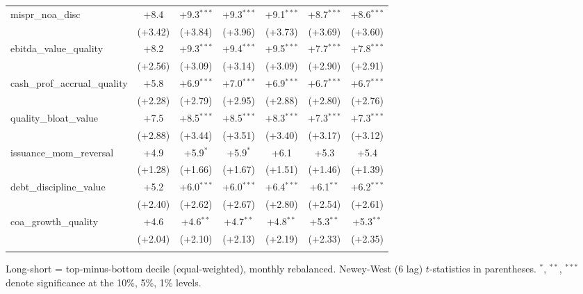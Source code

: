 \begin{table}[htbp]
\begin{threeparttable}
\begin{tabular}{lcccccc}
\addlinespace
mispr\_noa\_disc & +8.4 & +9.3$^{***}$ & +9.3$^{***}$ & +9.1$^{***}$ & +8.7$^{***}$ & +8.6$^{***}$ \\
 & (+3.42) & (+3.84) & (+3.96) & (+3.73) & (+3.69) & (+3.60) \\
\addlinespace
ebitda\_value\_quality & +8.2 & +9.3$^{***}$ & +9.4$^{***}$ & +9.5$^{***}$ & +7.7$^{***}$ & +7.8$^{***}$ \\
 & (+2.56) & (+3.09) & (+3.14) & (+3.09) & (+2.90) & (+2.91) \\
\addlinespace
cash\_prof\_accrual\_quality & +5.8 & +6.9$^{***}$ & +7.0$^{***}$ & +6.9$^{***}$ & +6.7$^{***}$ & +6.7$^{***}$ \\
 & (+2.28) & (+2.79) & (+2.95) & (+2.88) & (+2.80) & (+2.76) \\
\addlinespace
quality\_bloat\_value & +7.5 & +8.5$^{***}$ & +8.5$^{***}$ & +8.3$^{***}$ & +7.3$^{***}$ & +7.3$^{***}$ \\
 & (+2.88) & (+3.44) & (+3.51) & (+3.40) & (+3.17) & (+3.12) \\
\addlinespace
issuance\_mom\_reversal & +4.9 & +5.9$^{*}$ & +5.9$^{*}$ & +6.1 & +5.3 & +5.4 \\
 & (+1.28) & (+1.66) & (+1.67) & (+1.51) & (+1.46) & (+1.39) \\
\addlinespace
debt\_discipline\_value & +5.2 & +6.0$^{***}$ & +6.0$^{***}$ & +6.4$^{***}$ & +6.1$^{**}$ & +6.2$^{***}$ \\
 & (+2.40) & (+2.62) & (+2.67) & (+2.80) & (+2.54) & (+2.61) \\
\addlinespace
coa\_growth\_quality & +4.6 & +4.6$^{**}$ & +4.7$^{**}$ & +4.8$^{**}$ & +5.3$^{**}$ & +5.3$^{**}$ \\
 & (+2.04) & (+2.10) & (+2.13) & (+2.19) & (+2.33) & (+2.35) \\
\addlinespace
\bottomrule
\end{tabular}
\begin{tablenotes}\footnotesize
\item Long-short = top-minus-bottom decile (equal-weighted), monthly rebalanced. Newey-West (6 lag) $t$-statistics in parentheses. $^{*}$, $^{**}$, $^{***}$ denote significance at the 10\%, 5\%, 1\% levels.
\end{tablenotes}
\end{threeparttable}
\end{table}